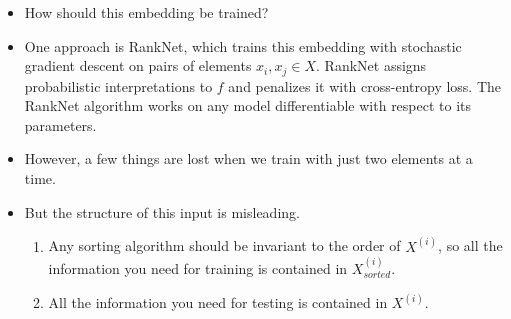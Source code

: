 \documentclass[11pt]{extarticle}
\begin{document}
\begin{itemize}
    \item How should this embedding be trained? 
    \item One approach is RankNet, which trains this embedding with stochastic gradient descent on pairs of elements $x_i, x_j \in X$. RankNet assigns probabilistic interpretations to $f$ and penalizes it with cross-entropy loss. The RankNet algorithm works on any model differentiable with respect to its parameters.
    \item However, a few things are lost when we train with just two elements at a time.

    \item But the structure of this input is misleading. 
    \begin{enumerate}
      \item Any sorting algorithm should be invariant to the order of $X^{(i)}$, so all the information you need for training is contained in $X^{(i)}_{sorted}$.
      \item All the information you need for testing is contained in $X^{(i)}$.
    \end{enumerate}
  \end{itemize}
\end{document}
